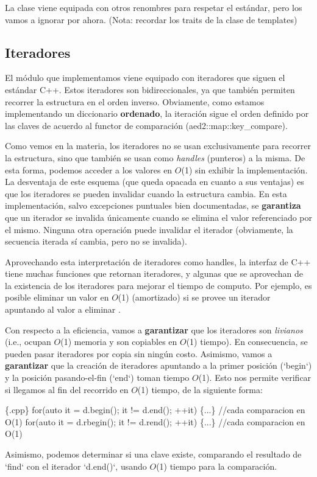 \-La clase viene equipada con otros renombres para respetar el estándar, pero los vamos a ignorar por ahora. (\-Nota\-: recordar los traits de la clase de templates)\hypertarget{Interfaz_Iteradores}{}\subsection{\-Iteradores}\label{Interfaz_Iteradores}
\-El módulo que implementamos viene equipado con iteradores que siguen el estándar \-C++. \-Estos iteradores son bidireccionales, ya que también permiten recorrer la estructura en el orden inverso. \-Obviamente, como estamos implementando un diccionario {\bfseries ordenado}, la iteración sigue el orden definido por las claves de acuerdo al functor de comparación (aed2\-::map\-::key\-\_\-compare).

\-Como vemos en la materia, los iteradores no se usan exclusivamente para recorrer la estructura, sino que también se usan como {\itshape handles\/} (punteros) a la misma. \-De esta forma, podemos acceder a los valores en $O$(1) sin exhibir la implementación. \-La desventaja de este esquema (que queda opacada en cuanto a sus ventajas) es que los iteradores se pueden invalidar cuando la estructura cambia. \-En esta implementación, salvo excepciones puntuales bien documentadas, se {\bfseries garantiza} que un iterador se invalida únicamente cuando se elimina el valor referenciado por el mismo. \-Ninguna otra operación puede invalidar el iterador (obviamente, la secuencia iterada sí cambia, pero no se invalida).

\-Aprovechando esta interpretación de iteradores como handles, la interfaz de \-C++ tiene muchas funciones que retornan iteradores, y algunas que se aprovechan de la existencia de los iteradores para mejorar el tiempo de computo. \-Por ejemplo, es posible eliminar un valor en $O$(1) (amortizado) si se provee un iterador apuntando al valor a eliminar \cite{MehlhornSanders2008}.

\-Con respecto a la eficiencia, vamos a {\bfseries garantizar} que los iteradores son {\itshape livianos\/} (i.\-e., ocupan $O$(1) memoria y son copiables en $O$(1) tiempo). \-En consecuencia, se pueden pasar iteradores por copia sin ningún costo. \-Asimismo, vamos a {\bfseries garantizar} que la creación de iteradores apuntando a la primer posición (`begin`) y la posición pasando-\/el-\/fin (`end`) toman tiempo $O$(1). \-Esto nos permite verificar si llegamos al fin del recorrido en $O$(1) tiempo, de la siguiente forma\-: 
\begin{DoxyCode}
 \{.cpp\}
 \textcolor{keywordflow}{for}(\textcolor{keyword}{auto} it = d.begin(); it != d.end(); ++it) \{...\}   \textcolor{comment}{//cada comparacion en
       O(1)}
 \textcolor{keywordflow}{for}(\textcolor{keyword}{auto} it = d.rbegin(); it != d.rend(); ++it) \{...\} \textcolor{comment}{//cada comparacion en
       O(1)}
\end{DoxyCode}
 \-Asimismo, podemos determinar si una clave existe, comparando el resultado de `find` con el iterador `d.end()`, usando $O$(1) tiempo para la comparación.

